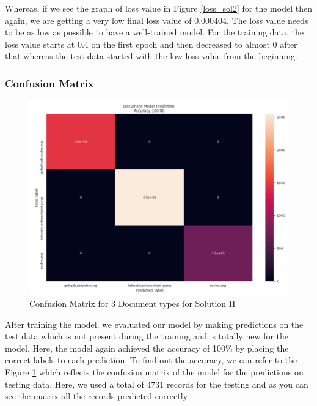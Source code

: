 \par
Whereas, if we see the graph of loss value in Figure \ref{loss_sol2} for the model then again, we are getting a very low final loss value of 0.000404. The loss value needs to be as low as possible to have a well-trained model. For the training data, the loss value starts at 0.4 on the first epoch and then decreased to almost 0 after that whereas the test data started with the low loss value from the beginning.
\subsubsection{Confusion Matrix}
\begin{figure}[H]
\centering
\includegraphics[scale=0.7]{images/Chapter5/sol_2/cm-sol1.png}
\caption{Confusion Matrix for 3 Document types  for Solution II}
\label{cm_sol2}
\end{figure}
\par
After training the model, we evaluated our model by making predictions on the test data which is not present during the training and is totally new for the model. Here, the model again achieved the accuracy of 100\% by placing the correct labels to each prediction. To find out the accuracy, we can refer to the Figure \ref{cm_sol2} which reflects the confusion matrix of the model for the predictions on testing data. Here, we used a total of 4731 records for the testing and as you can see the matrix all the records predicted correctly.
